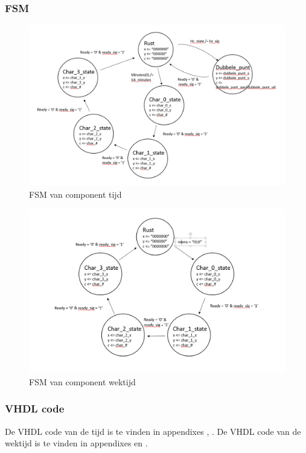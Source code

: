 \subsubsection{FSM}
\begin{figure}[h!]
	\center
	\includegraphics[scale=1.9]{Figuren/LCD/fsm_tijd.png}
	\caption{FSM van component tijd}
	\label{fig:fsm_tijd}
\end{figure}
\begin{figure}[h!]
	\center
	\includegraphics[scale=1.9]{Figuren/LCD/fsm_wektijd.png}
	\caption{FSM van component wektijd}
	\label{fig:fsm_wektijd}
\end{figure}

\subsubsection{VHDL code}
De VHDL code van de tijd is te vinden in appendixes \cite{code:ent_tijd}, \cite{code:beh_tijd}. De VHDL code van de wektijd is te vinden in appendixes \cite{code:ent_wektijd} en \cite{code:beh_wektijd}.

